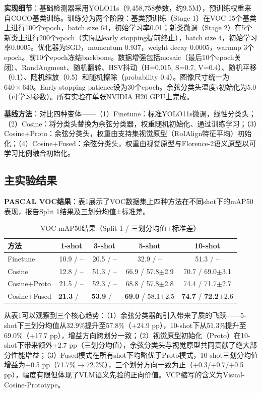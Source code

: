 \documentclass[zihao=5,a4paper,twocolumn]{ctexart}
\begin{document}
\textbf{实现细节}：基础检测器采用YOLO11s（9,458,758参数，约9.5M），预训练权重来自COCO基类训练。训练分为两个阶段：基类预训练（Stage 1）在VOC 15个基类上进行100个epoch，batch size 64，初始学习率0.01；新类微调（Stage 2）在5个新类上进行200个epoch（实际因early stopping提前终止），batch size 4，初始学习率0.0005。优化器为SGD，momentum 0.937，weight decay 0.0005，warmup 3个epoch。前10个epoch冻结backbone。数据增强包括mosaic（最后10个epoch关闭）、RandAugment、随机翻转、HSV抖动（H=0.015, S=0.7, V=0.4）、随机平移（0.1）、随机缩放（0.5）和随机擦除（probability 0.4）。图像尺寸统一为$640\times640$。Early stopping patience设为30个epoch。余弦分类头温度$\tau$初始化为5.0（可学习参数）。所有实验在单张NVIDIA H20 GPU上完成。

\textbf{基线方法}：对比四种变体——（1）Finetune：标准YOLO11s微调，线性分类头；（2）Cosine：将分类头替换为余弦分类器，权重随机初始化、通过训练学习；（3）Cosine+Proto：余弦分类头，权重由支持集视觉原型（RoIAlign特征平均）初始化；（4）Cosine+Fused：余弦分类头，权重由视觉原型与Florence-2语义原型以可学习比例融合初始化。

\subsection{主实验结果}

\textbf{PASCAL VOC结果}：表1展示了VOC数据集上四种方法在不同shot下的mAP50表现，报告Split 1结果及三划分均值±标准差。

\begin{table}[ht]
\centering
\footnotesize
\caption{VOC mAP50结果（Split 1 / 三划分均值$\pm$标准差）}
\label{tab:voc_main}
\begin{tabular}{lcccc}
\toprule
方法 & 1-shot & 3-shot & 5-shot & 10-shot \\
\midrule
Finetune      & 10.9 / --   & 20.5 / --    & 32.9 / --    & 51.3 / --     \\
Cosine        & 12.8 / --   & 51.3 / --    & 66.9 / 57.8$\pm$2.9 & 70.7 / 69.0$\pm$3.1 \\
Cosine+Proto  & 21.5 / --   & 52.3 / --    & 68.8 / 57.8$\pm$2.8 & 74.4 / 71.7$\pm$2.7 \\
Cosine+Fused  & \textbf{21.3} / -- & \textbf{53.9} / -- & \textbf{69.0} / 58.1$\pm$2.5 & \textbf{74.7} / \textbf{72.2}$\pm$2.6 \\
\bottomrule
\end{tabular}
\end{table}

从表1可以观察到三个核心趋势：（1）余弦分类器的引入带来了质的飞跃——5-shot下三划分均值从32.9\%提升至57.8\%（+24.9 pp），10-shot下从51.3\%提升至69.0\%（+17.7 pp），增益方向跨划分一致；（2）视觉原型初始化（Proto）在10-shot下带来额外+2.7 pp（三划分均值），余弦分类头与视觉原型共同贡献了绝大部分性能增益；（3）Fused模式在所有shot下均略优于Proto模式，10-shot三划分均值增益为+0.5 pp（71.7\%$\rightarrow$72.2\%），三个划分方向一致为正（+0.3/+0.7/+0.5 pp），幅度有限但体现了VLM语义先验的正向价值。VCP缩写的含义为Visual-Cosine-Prototype。
\end{document}
